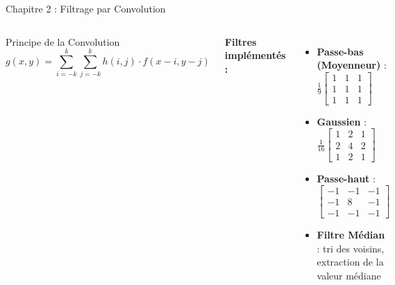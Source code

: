 \documentclass[aspectratio=169, 11pt]{beamer}
\begin{document}
\begin{frame}{Chapitre 2 : Filtrage par Convolution}
  \begin{columns}[T]
    \begin{block}{Principe de la Convolution}
      \[ g(x,y) = \sum_{i=-k}^{k} \sum_{j=-k}^{k} h(i,j) \cdot f(x-i, y-j) \]
    \end{block}
    \vspace{4pt}
    \textbf{Filtres implémentés :}
    \begin{itemize}
      \item \textbf{Passe-bas (Moyenneur)} :
        $\frac{1}{9}\begin{bmatrix} 1&1&1\\1&1&1\\1&1&1 \end{bmatrix}$
      \item \textbf{Gaussien} :
        $\frac{1}{16}\begin{bmatrix} 1&2&1\\2&4&2\\1&2&1 \end{bmatrix}$
      \item \textbf{Passe-haut} :
        $\begin{bmatrix} -1&-1&-1\\-1&8&-1\\-1&-1&-1 \end{bmatrix}$
      \item \textbf{Filtre Médian} : tri des voisins, extraction de la valeur médiane
    \end{itemize}

  \end{columns}
\end{frame}

\end{document}
